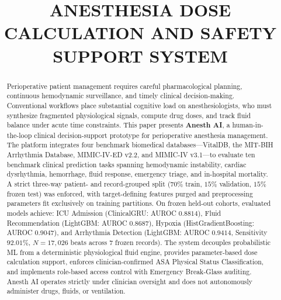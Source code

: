 \documentclass[conference]{IEEEtran}
\begin{document}
\title{ANESTHESIA DOSE CALCULATION AND SAFETY SUPPORT SYSTEM}

\author{
}

\maketitle

\begin{abstract}
Perioperative patient management requires careful pharmacological planning, continuous hemodynamic surveillance, and timely clinical decision-making. Conventional workflows place substantial cognitive load on anesthesiologists, who must synthesize fragmented physiological signals, compute drug doses, and track fluid balance under acute time constraints. This paper presents \textbf{Anesth AI}, a human-in-the-loop clinical decision-support prototype for perioperative anesthesia management. The platform integrates four benchmark biomedical databases---VitalDB, the MIT-BIH Arrhythmia Database, MIMIC-IV-ED v2.2, and MIMIC-IV v3.1---to evaluate ten benchmark clinical prediction tasks spanning hemodynamic instability, cardiac dysrhythmia, hemorrhage, fluid response, emergency triage, and in-hospital mortality. A strict three-way patient- and record-grouped split ($70\%$ train, $15\%$ validation, $15\%$ frozen test) was enforced, with target-defining features purged and preprocessing parameters fit exclusively on training partitions. On frozen held-out cohorts, evaluated models achieve: ICU Admission (ClinicalGRU: AUROC $0.8814$), Fluid Recommendation (LightGBM: AUROC $0.8687$), Hypoxia (HistGradientBoosting: AUROC $0.9047$), and Arrhythmia Detection (LightGBM: AUROC $0.9414$, Sensitivity $92.01\%$, $N{=}17{,}026$ beats across 7 frozen records). The system decouples probabilistic ML from a deterministic physiological fluid engine, provides parameter-based dose calculation support, enforces clinician-confirmed ASA Physical Status Classification, and implements role-based access control with Emergency Break-Glass auditing. Anesth AI operates strictly under clinician oversight and does not autonomously administer drugs, fluids, or ventilation.
\end{abstract}
\end{document}
